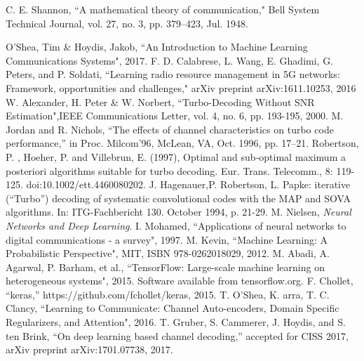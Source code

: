 \documentclass[conference]{IEEEtran}
\begin{document}
\begin{thebibliography}{00}
 C. E. Shannon, ``A mathematical theory of communication," Bell System Technical Journal, vol. 27, no. 3, pp. 379–423, Jul. 1948.

 O'Shea, Tim \& Hoydis, Jakob, ``An Introduction to Machine Learning Communications Systems", 2017.
 F. D. Calabrese, L. Wang, E. Ghadimi, G. Peters, and P. Soldati, ``Learning radio resource management in 5G networks: Framework,
opportunities and challenges," arXiv preprint arXiv:1611.10253, 2016
 W. Alexander, H. Peter \& W. Norbert, ``Turbo-Decoding Without SNR Estimation",IEEE Communications Letter, vol. 4, no. 6, pp. 193-195, 2000.
 M. Jordan and R. Nichols, “The effects of channel characteristics on turbo code performance,” in Proc. Milcom’96, McLean, VA, Oct. 1996, pp. 17–21.
 Robertson, P. , Hoeher, P. and Villebrun, E. (1997), Optimal and sub‐optimal maximum a posteriori algorithms suitable for turbo decoding. Eur. Trans. Telecomm., 8: 119-125. doi:10.1002/ett.4460080202.
 J. Hagenauer,P. Robertson, L. Papke: iterative (“Turbo”) decoding of systematic convolutional codes with the MAP and SOVA
algorithms. In: ITG-Fachbericht 130. October 1994, p. 21-29.
 M. Nielsen, \textit{Neural Networks and Deep Learning}.
 I. Mohamed, ``Applications of neural networks to digital communications - a survey", 1997.
 M. Kevin, ``Machine Learning: A Probabilistic Perspective", MIT, ISBN 978-0262018029, 2012.
 M. Abadi, A. Agarwal, P. Barham, et al., 
``TensorFlow: Large-scale machine learning on heterogeneous systems", 2015. Software available from tensorflow.org.
 F. Chollet, “keras,” https://github.com/fchollet/keras, 2015.
 T. O'Shea, K. arra, T. C. Clancy, ``Learning to Communicate: Channel Auto-encoders, Domain Specific Regularizers, and Attention", 2016.
 T. Gruber, S. Cammerer, J. Hoydis, and S. ten Brink, “On deep learning based channel decoding,” accepted for CISS 2017, arXiv preprint arXiv:1701.07738, 2017.



\end{thebibliography}
\end{document}
